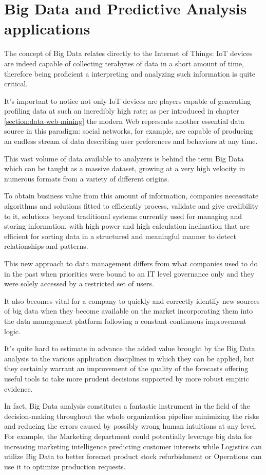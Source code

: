 \section{Big Data and Predictive Analysis applications}

The concept of Big Data relates directly to the Internet of Things: IoT devices are indeed capable of collecting terabytes of data in a short amount of time, therefore being proficient a interpreting and analyzing such information is quite critical.

It's important to notice not only IoT devices are players capable of generating profiling data at such an incredibly high rate;  as per introduced in chapter \ref{section:data-web-mining} the modern Web represents another essential data source in this paradigm: social networks, for example, are capable of producing an endless stream of data describing user preferences and behaviors at any time.

This vast volume of data available to analyzers is behind the term Big Data which can be taught as a massive dataset, growing at a very high velocity in numerous formats from a variety of different origins.

To obtain business value from this amount of information, companies necessitate algorithms and solutions fitted to efficiently process, validate and give credibility to it, solutions beyond traditional systems currently used for managing and storing information, with high power and high calculation inclination that are efficient for sorting data in a structured and meaningful manner to detect relationships and patterns.

This new approach to data management differs from what companies used to do in the past when priorities were bound to an IT level governance only and they were solely accessed by a restricted set of users. 

It also becomes vital for a company to quickly and correctly identify new sources of big data when they become available on the market incorporating them into the data management platform following a constant continuous improvement logic.

It's quite hard to estimate in advance the added value brought by the Big Data analysis to the various application disciplines in which they can be applied, but they certainly warrant an improvement of the quality of the forecasts offering useful tools to take more prudent decisions supported by more robust empiric evidence.

In fact, Big Data analysis constitutes a fantastic instrument in the field of the decision-making throughout the whole organization pipeline minimizing the risks and reducing the errors caused by possibly wrong human intuitions at any level. For example, the Marketing department could potentially leverage big data for increasing marketing intelligence predicting customer interests while Logistics can utilize Big Data to better forecast product stock refurbishment or Operations can use it to optimize production requests.

